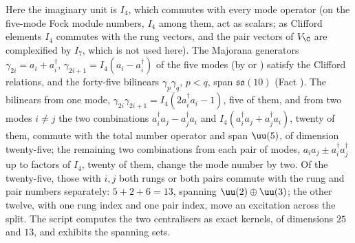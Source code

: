Here the imaginary unit is $I_{4}$, which commutes with every mode operator (on the five-mode Fock module numbers, $I_{4}$ among them, act as scalars; as Clifford elements $I_{4}$ commutes with the rung vectors, and the pair vectors of $V_{\C}$ are complexified by $I_{7}$, which is not used here). The Majorana generators $\gamma_{2i} = a_{i} + a_{i}^{\dagger}$, $\gamma_{2i+1} = I_{4}(a_{i} - a_{i}^{\dagger})$ of the five modes (by  or ) satisfy the Clifford relations, and the forty-five bilinears $\gamma_{p}\gamma_{q}$, $p < q$, span $\mathfrak{so}(10)$ (Fact ). The bilinears from one mode, $\gamma_{2i}\gamma_{2i+1} = I_{4}(2a_{i}^{\dagger}a_{i} - 1)$, five of them, and from two modes $i \neq j$ the two combinations $a_{i}^{\dagger}a_{j} - a_{j}^{\dagger}a_{i}$ and $I_{4}(a_{i}^{\dagger}a_{j} + a_{j}^{\dagger}a_{i})$, twenty of them, commute with the total number operator and span $\uu(5)$, of dimension twenty-five; the remaining two combinations from each pair of modes, $a_{i}a_{j} \pm a_{i}^{\dagger}a_{j}^{\dagger}$ up to factors of $I_{4}$, twenty of them, change the mode number by two. Of the twenty-five, those with $i, j$ both rungs or both pairs commute with the rung and pair numbers separately: $5 + 2 + 6 = 13$, spanning $\uu(2) \oplus \uu(3)$; the other twelve, with one rung index and one pair index, move an excitation across the split. The script computes the two centralisers as exact kernels, of dimensions $25$ and $13$, and exhibits the spanning sets.
